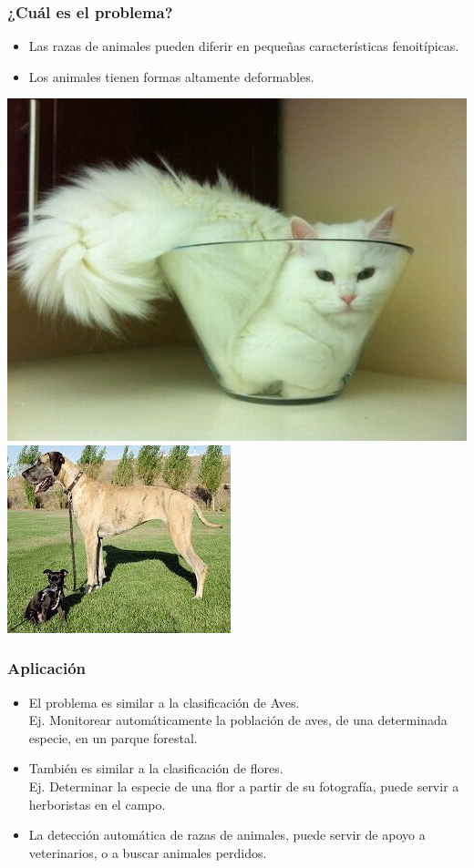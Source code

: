 \documentclass{beamer}
\begin{document}
\begin{frame}
	\end{frame}
	\begin{frame}
		\frametitle{¿Cuál es el problema?}
		\begin{itemize}
			\item{
				Las razas de animales pueden diferir en pequeñas características fenoitípicas.
			}
			\item{
				Los animales tienen formas altamente deformables.
			}
		\end{itemize}
		{\includegraphics[scale=0.2]{imagen/fitsisits.jpg}}
		{\includegraphics[scale=0.5]{imagen/dogdiff.jpg}}
	\end{frame}
	\begin{frame}
		\frametitle{Aplicación}
		\begin{itemize}
			\item{El problema es similar a la clasificación de Aves.\\
			Ej. Monitorear automáticamente la población de aves, de una determinada especie, en un parque forestal.\\
			}
			\item{También es similar a la clasificación de  flores.\\
			Ej. Determinar la especie de una flor a partir de su fotografía, puede servir a herboristas en el campo.
			}
			\item{La detección automática de razas de animales, puede servir de apoyo a veterinarios, o a buscar animales perdidos.\\
			}
		\end{itemize}
	\end{frame}
\end{document}
